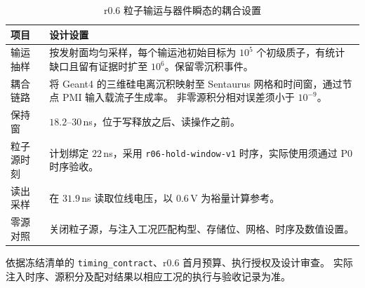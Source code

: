 \begin{table}[tbp]
  \centering
  \small
  \caption{r0.6 粒子输运与器件瞬态的耦合设置}
  \label{tab:r06-modeling-coupling}
  \begin{tabularx}{\linewidth}{@{}l>{\raggedright\arraybackslash}X@{}}
    \toprule
    项目 & 设计设置 \\
    \midrule
    输运抽样 & 按发射面均匀采样，每个输运池初始目标为 \(10^5\) 个初级质子，有统计缺口且留有证据时扩至 \(10^6\)。保留零沉积事件。 \\
    耦合链路 & 将 Geant4 的三维硅电离沉积映射至 Sentaurus 网格和时间窗，通过节点 PMI 输入载流子生成率。
    非零源积分相对误差须小于 \(10^{-9}\)。 \\
    保持窗 & \(18.2\text{--}30\)\,ns，位于写释放之后、读操作之前。 \\
    粒子源时刻 & 计划绑定 \(22\)\,ns，采用 \texttt{r06-hold-window-v1} 时序，实际使用须通过 P0 时序验收。 \\
    读出采样 & 在 \(31.9\)\,ns 读取位线电压，以 \(0.6\)\,V 为裕量计算参考。 \\
    零源对照 & 关闭粒子源，与注入工况匹配构型、存储位、网格、时序及数值设置。 \\
    \bottomrule
  \end{tabularx}
  \par\smallskip
  \begin{minipage}{\linewidth}
    \footnotesize
    依据冻结清单的 \texttt{timing\_contract}、r0.6 首月预算、执行授权及设计审查。
    实际注入时序、源积分及配对结果以相应工况的执行与验收记录为准。
  \end{minipage}
\end{table}

